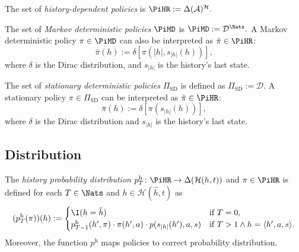 \begin{definition} \label{def:policy-hr}
The set of \emph{history-dependent policies} is \(\PiHR :=  \Delta(\mathcal{A})^{\mathcal{H}}. \)
\end{definition}


\begin{definition} \label{def:policy-md}
The set of \emph{Markov deterministic policies} $\PiMD$ is \(\PiMD :=  \mathcal{D}^{\Nats}. \)
A Markov deterministic policy $\pi \in \PiMD$ can also be interpreted as $\bar{\pi} \in \PiHR$:
\[
  \bar{\pi}(h) := \delta \left[  \pi(|h|, s_{|h|}(h)) \right],
\]
where $\delta$ is the Dirac distribution,  and $s_{|h|}$ is the history's last state.
\end{definition}

\begin{definition} \label{def:policy-sd}
The set of \emph{stationary deterministic policies} $\Pi_{\mathrm{SD}}$ is defined as \(\Pi_{\mathrm{SD}} := \mathcal{D}. \)
A stationary policy $\pi \in \Pi_{\mathrm{SD}}$ can be interpreted as $\bar{\pi} \in \PiHR$:
\[
  \bar{\pi}(h) := \delta \left[  \pi(s_{|h|}(h)) \right],
\]
where $\delta$ is the Dirac distribution and $s_{|h|}$ is the history's last state.
\end{definition}

\subsection{Distribution}


\begin{definition}\label{def:hist-dist}
The \emph{history probability distribution} $p^{\mathrm{h}}_T \colon  \PiHR \to \Delta(\mathcal{H}(h,t))$  and $\pi \in \PiHR$ is defined for each $T \in \Nats$ and $h\in \mathcal{H}(\hat{h},t)$ as
\[
(p^{\mathrm{h}}_T(\pi))(h) :=
\begin{cases}
\I(h = \hat{h}) &\text{if } T = 0, \\
p_{T-1}^{\mathrm{h}}(h', \pi) \cdot \pi(h',a) \cdot  p(s_{|h|}(h'), a , s) &\text{if } T > 1 \wedge h = \langle h', a, s \rangle.
\end{cases}
\]
Moreover, the function $p^{\mathrm{h}}$ maps policies to correct probability distribution.
\end{definition}

